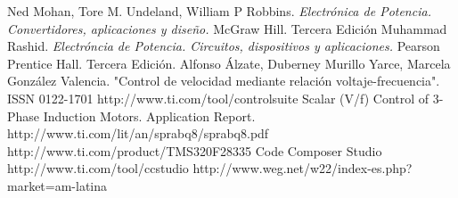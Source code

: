 \documentclass[conference]{IEEEtran}
\begin{document}
\ifCLASSOPTIONcaptionsoff
  \newpage
\fi

\begin{thebibliography}{1}

 Ned Mohan, Tore M. Undeland, William P Robbins. \textit{Electrónica de Potencia. Convertidores, aplicaciones y diseño.} McGraw Hill. Tercera Edición
 Muhammad Rashid. \textit{Electróncia de Potencia. Circuitos, dispositivos y aplicaciones.} Pearson Prentice Hall. Tercera Edición.
 Alfonso Álzate, Duberney Murillo Yarce, Marcela González Valencia. "Control de velocidad mediante relación voltaje-frecuencia".  ISSN 0122-1701
 http://www.ti.com/tool/controlsuite
 Scalar (V/f) Control of 3-Phase Induction Motors. Application Report. http://www.ti.com/lit/an/sprabq8/sprabq8.pdf
 http://www.ti.com/product/TMS320F28335
 Code Composer Studio\\ http://www.ti.com/tool/ccstudio
 http://www.weg.net/w22/index-es.php?market=am-latina

\end{thebibliography}
\end{document}
